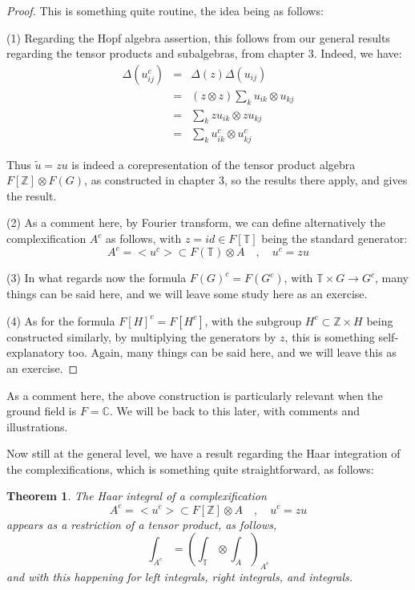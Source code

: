 \documentclass[12pt]{amsbook}
\newtheorem{theorem}{Theorem}[chapter]
\begin{document}
\begin{proof}
This is something quite routine, the idea being as follows:

\medskip

(1) Regarding the Hopf algebra assertion, this follows from our general results regarding the tensor products and subalgebras, from chapter 3. Indeed, we have:
\begin{eqnarray*}
\Delta(u^c_{ij})
&=&\Delta(z)\Delta(u_{ij})\\
&=&(z\otimes z)\sum_ku_{ik}\otimes u_{kj}\\
&=&\sum_k zu_{ik}\otimes zu_{kj}\\
&=&\sum_ku^c_{ik}\otimes u^c_{kj}
\end{eqnarray*}

Thus $\tilde{u}=zu$ is indeed a corepresentation of the tensor product algebra $F[\mathbb Z]\otimes F(G)$, as constructed in chapter 3, so the results there apply, and gives the result.

\medskip

(2) As a comment here, by Fourier transform, we can define alternatively the complexification $A^c$ as follows, with $z=id\in F[\mathbb T]$ being the standard generator:
$$A^c=<u^c>\subset F(\mathbb T)\otimes A\quad,\quad u^c=zu$$

(3) In what regards now the formula $F(G)^c=F(G^c)$, with $\mathbb T\times G\to G^c$, many things can be said here, and we will leave some study here as an exercise.

\medskip

(4) As for the formula $F[H]^c=F[H^c]$, with the subgroup $H^c\subset\mathbb Z\times H$ being constructed similarly, by multiplying the generators by $z$, this is something self-explanatory too. Again, many things can be said here, and we will leave this as an exercise.
\end{proof}

As a comment here, the above construction is particularly relevant when the ground field is $F=\mathbb C$. We will be back to this later, with comments and illustrations. 

\bigskip

Now still at the general level, we have a result regarding the Haar integration of the complexifications, which is something quite straightforward, as follows:

\begin{theorem}
The Haar integral of a complexification
$$A^c=<u^c>\subset F[\mathbb Z]\otimes A\quad,\quad u^c=zu$$
appears as a restriction of a tensor product, as follows,
$$\int_{A^c}=\left(\int_\mathbb T\otimes\int_A\right)_{A^c}$$
and with this happening for left integrals, right integrals, and integrals.
\end{theorem}
\end{document}

